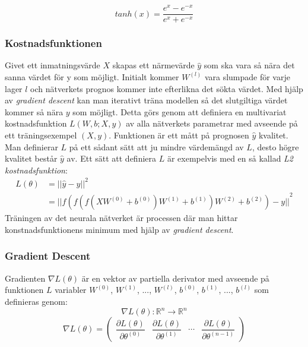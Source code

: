 \documentclass[a4paper,11pt,twoside]{article}
\newcommand*{\pd}[2]{\ensuremath{\dfrac{\partial #1}{\partial #2}}}
\begin{document}
\begin{equation}
tanh(x) = \frac{e^x-e^{-x}}{e^x+e^{-x}}
\end{equation}

\subsubsection{Kostnadsfunktionen}
Givet ett inmatningsvärde $X$ skapas ett närmevärde $\hat{y}$ som ska vara så nära det sanna värdet för y som möjligt. Initialt kommer $W^{(l)}$ vara slumpade för varje lager $l$ och nätverkets prognos kommer inte efterlikna det sökta värdet. Med hjälp av \textit{gradient descent} kan man iterativt träna modellen så det slutgiltiga värdet kommer så nära $y$ som möjligt. Detta görs genom att definiera en multivariat kostnadsfunktion $L(W, b; X,y)$ av alla nätverkets parametrar med avseende på ett träningsexempel $(X, y)$. Funktionen är ett mått på prognosen $\hat{y}$ kvalitet. Man definierar $L$ på ett sådant sätt att ju mindre värdemängd av $L$, desto högre kvalitet består $\hat{y}$ av. Ett sätt att definiera $L$ är exempelvis med en så kallad \textit{L2 kostnadsfunktion}: \cite{cs231n} \cite{wikiStanford}
\begin{equation}
\begin{split}
L(\theta) 	& = {||\hat{y}-y||}^2 \\
		& = {||f(f(f(XW^{(0)} +b^{(0)})W^{(1)} +b^{(1)})W^{(2)} +b^{(2)}) - y||}^2
\end{split}
\end{equation}
Träningen av det neurala nätverket är processen där man hittar konstnadsfunktionens minimum med hjälp av \textit{gradient descent}.

\subsubsection{Gradient Descent}
Gradienten $\nabla L(\theta)$ är en vektor av partiella derivator med avseende på funktionen $L$ variabler $W^{(0)}$, $W^{(1)}$, ..., $W^{(l)}$, $b^{(0)}$, $b^{(1)}$, ..., $b^{(l)}$ som definieras genom: \cite{gradient} \cite{convmath} 
\begin{equation}
\nabla L(\theta) : \mathbb{R}^n \to \mathbb{R}^n
\end{equation}
\begin{equation}
\nabla L(\theta) = 
	\begin{pmatrix} 
		\pd{L(\theta)}{\theta^{(0)}} & 
		\pd{L(\theta)}{\theta^{(1)}} &
		\cdots &
		\pd{L(\theta)}{\theta^{(n-1)}}
		
		\end{pmatrix}
\end{equation}
\end{document}
